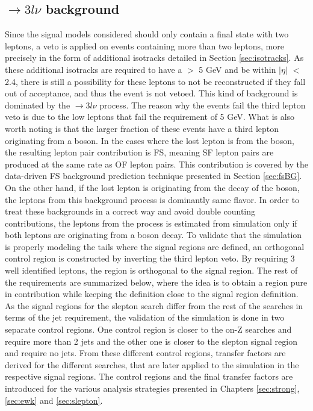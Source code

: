 \subsection*{\PWZ$\rightarrow3l\nu$ background}
\noindent
\justify
Since the signal models considered should only contain a final state with two leptons, a veto is applied on events containing more than two leptons, more precisely in the form of additional isotracks
 detailed in Section \ref{sec:isotracks}. 
As these additional isotracks are required to have a \pt $>$ 5 GeV and be within $|\eta|$ $<$ 2.4, there is still a possibility for these leptons to not be reconstructed if they fall out of acceptance, and thus the event is not vetoed. 
This kind of background is dominated by the \PWZ$\rightarrow3l\nu$ process.
The reason why the events fail the third lepton veto is due to the low \pt leptons that fail the \pt requirement of 5 GeV. 
What is also worth noting is that the larger fraction of these events have a third lepton originating from a \PZ boson. 
In the cases where the lost lepton is from the \PZ boson, the resulting lepton pair contribution is FS, meaning SF lepton pairs are produced at the same rate as OF lepton pairs. 
This contribution is covered by the data-driven FS background prediction technique presented in Section \ref{sec:fsBG}.
On the other hand, if the lost lepton is originating from the decay of the \PW boson, the leptons from this background process is dominantly same flavor. 
In order to treat these backgrounds in a correct way and avoid double counting contributions, the leptons from the \PWZ process is estimated from simulation only if both leptons are originating from a \PZ boson decay. 
\newpara
\noindent\justify
To validate that the simulation is properly modeling the \ptmiss tails where the signal regions are defined, an orthogonal control region is constructed by inverting the third lepton veto. 
By requiring 3 well identified leptons, the region is orthogonal to the signal region. 
The rest of the requirements are summarized below, where the idea is to obtain a region pure in \PWZ contribution while keeping the definition close to the signal region definition. 
As the signal regions for the slepton search differ from the rest of the searches in terms of the jet requirement, the validation of the \PWZ simulation is done in two separate control regions. 
One control region is closer to the on-Z searches and require more than 2 jets and the other one is closer to the slepton signal region and require no jets. 
From these different control regions, transfer factors are derived for the different searches, that are later applied to the simulation in the respective signal regions. 
The control regions and the final transfer factors are introduced for the various analysis strategies presented in Chapters \ref{sec:strong}, \ref{sec:ewk} and \ref{sec:slepton}. 
